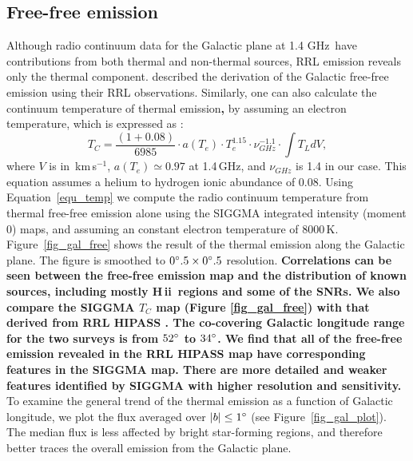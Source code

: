 \documentclass[manuscript]{aastex61}
\newcommand{\hii}{{\rm H\,}{{\sc ii}}}
\newcommand{\kms}{\,km\,s$^{-1}$}
\newcommand{\ghz}{\,GHz}
\begin{document}
\subsection{Free-free emission} \label{sec_gal_free}
Although radio continuum data for the Galactic plane at 1.4\,\ghz\ have contributions from both thermal and non-thermal sources, RRL emission reveals only the thermal component.
\citet{Alves2012} described the derivation of the Galactic free-free emission using their RRL observations.
Similarly, one can also calculate the continuum temperature of thermal emission\textbf{,} by assuming an electron temperature, which is expressed as \citep{Mezger1967a, Lockman1978, Quireza2006a}:
\begin{equation}
  T_C=
  \frac{(1+0.08)}{6985}\cdot a(T_e) \cdot T_e^{1.15} \cdot \nu _{GHz}^{-1.1} \cdot \int T_L dV,
  \label{equ_temp}
\end{equation}
where $V$ is in \kms, $a(T_e) \simeq 0.97$ at 1.4\ghz, and $\nu_{GHz}$ is 1.4 in our case.  This equation assumes a helium to hydrogen ionic abundance of 0.08.
Using Equation~\ref{equ_temp} we compute the radio continuum temperature from thermal free-free emission alone using the SIGGMA integrated intensity (moment 0) maps, and assuming an constant electron temperature of 8000\,K.
Figure~\ref{fig_gal_free} shows the result of the thermal emission along the Galactic plane.
The figure is smoothed to $0\mbox{$^\circ$}.5 \times 0\mbox{$^\circ$}.5$ resolution.
\textbf{Correlations can be seen between the free-free emission map and the distribution of known sources, including mostly \hii\ regions and some of the SNRs.
We also compare the SIGGMA $T_C$ map (Figure \ref{fig_gal_free}) with that derived from RRL HIPASS \cite[see Figure 7 in][]{Alves2015}. The co-covering Galactic longitude range for the two surveys is from $52\mbox{$^\circ$}$ to $34\mbox{$^\circ$}$. We find that all of the free-free emission revealed in the RRL HIPASS map have corresponding features in the SIGGMA map. There are more detailed and weaker features identified by SIGGMA with higher resolution and sensitivity.
}
To examine the general trend of the thermal emission as a function of Galactic longitude, we plot the flux averaged over $|b| \leq 1\mbox{$^\circ$}$ (see Figure~\ref{fig_gal_plot}). 
The median flux is less affected by bright star-forming regions, and therefore better traces the overall emission from the Galactic plane.
\end{document}
